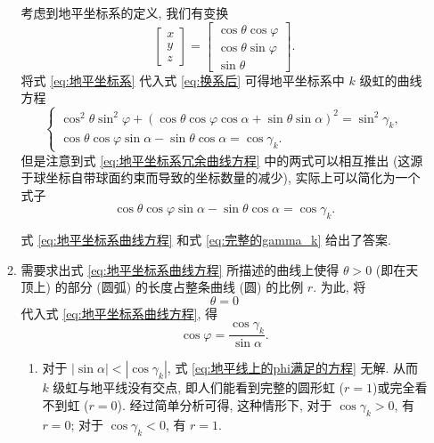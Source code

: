 \documentclass{article}
\begin{document}
\begin{enumerate}
\begin{enumerate}
	考虑到地平坐标系的定义, 我们有变换
	\begin{equation}
		\left[\begin{matrix}x\\y\\z\end{matrix}\right]=
		\left[\begin{matrix}\cos\theta\cos\varphi \\ \cos\theta\sin\varphi \\ \sin\theta\end{matrix}\right].
		\label{eq:地平坐标系}
	\end{equation}
	将式 \ref{eq:地平坐标系} 代入式 \ref{eq:换系后} 可得地平坐标系中 $k$ 级虹的曲线方程
	\begin{equation}
		\begin{cases}
			\cos^2\theta\sin^2\varphi+\left(\cos\theta\cos\varphi\cos\alpha+\sin\theta\sin\alpha\right)^2=\sin^2\gamma_k,\\
			\cos\theta\cos\varphi\sin\alpha-\sin\theta\cos\alpha=\cos\gamma_k.
		\end{cases}
		\label{eq:地平坐标系冗余曲线方程}
	\end{equation}
	但是注意到式 \ref{eq:地平坐标系冗余曲线方程} 中的两式可以相互推出 (这源于球坐标自带球面约束而导致的坐标数量的减少), 实际上可以简化为一个式子
	\begin{equation}
		\cos\theta\cos\varphi\sin\alpha-\sin\theta\cos\alpha=\cos\gamma_k.
		\label{eq:地平坐标系曲线方程}
	\end{equation}

	式 \ref{eq:地平坐标系曲线方程} 和式 \ref{eq:完整的gamma_k} 给出了答案.

	\item
	需要求出式 \ref{eq:地平坐标系曲线方程} 所描述的曲线上使得 $\theta>0$ (即在天顶上) 的部分 (圆弧) 的长度占整条曲线 (圆) 的比例 $r$.
	为此, 将
	\begin{equation}
		\theta=0
		\label{eq:地平线}
	\end{equation}
	代入式 \ref{eq:地平坐标系曲线方程}, 得
	\begin{equation}
		\cos\varphi=\frac{\cos\gamma_k}{\sin\alpha}.
		\label{eq:地平线上的phi满足的方程}
	\end{equation}

	\begin{enumerate}

		\item
		对于 $\left|\sin\alpha\right|<\left|\cos\gamma_k\right|$, 式 \ref{eq:地平线上的phi满足的方程} 无解.
		从而 $k$ 级虹与地平线没有交点, 即人们能看到完整的圆形虹 ($r=1$)或完全看不到虹 ($r=0$).
		经过简单分析可得, 这种情形下, 对于 $\cos\gamma_k>0$, 有 $r=0$; 对于 $\cos\gamma_k<0$, 有 $r=1$.


\end{enumerate}
\end{enumerate}
\end{enumerate}
\end{document}
